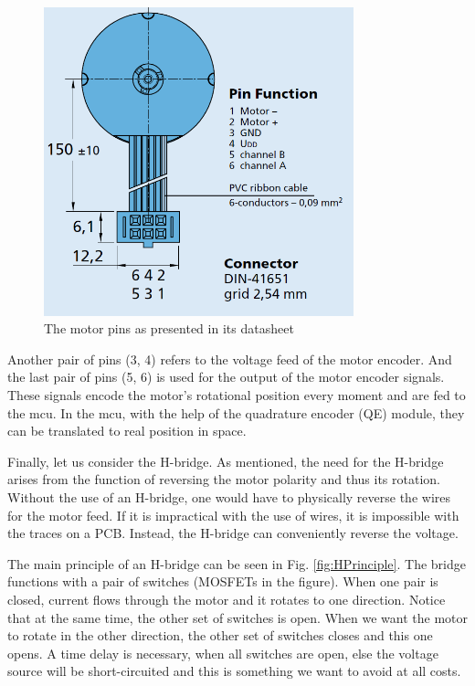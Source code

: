 \begin{figure}[htb]
    \centering
    \includegraphics[width=0.8\textwidth]{figures/hardware/motor.PNG}
    \caption{The motor pins as presented in its datasheet}
    \label{fig:motorPins}
\end{figure}

\FloatBarrier
\noindent
Another pair of pins (3, 4) refers to the voltage feed of the motor encoder. And the last pair of pins (5, 6) is used for the output of the motor encoder signals. These signals encode the motor's rotational position every moment and are fed to the mcu. In the mcu, with the help of the quadrature encoder (QE) module, they can be translated to real position in space.

Finally, let us consider the H-bridge. As mentioned, the need for the H-bridge arises from the function of reversing the motor polarity and thus its rotation. Without the use of an H-bridge, one would have to physically reverse the wires for the motor feed. If it is impractical with the use of wires, it is impossible with the traces on a PCB. Instead, the H-bridge can conveniently reverse the voltage. 

The main principle of an H-bridge can be seen in Fig. \ref{fig:HPrinciple}. The bridge functions with a pair of switches (MOSFETs in the figure). When one pair is closed, current flows through the motor and it rotates to one direction. Notice that at the same time, the other set of switches is open. When we want the motor to rotate in the other direction, the other set of switches closes and this one opens. A time delay is necessary, when all switches are open, else the voltage source will be short-circuited and this is something we want to avoid at all costs.

